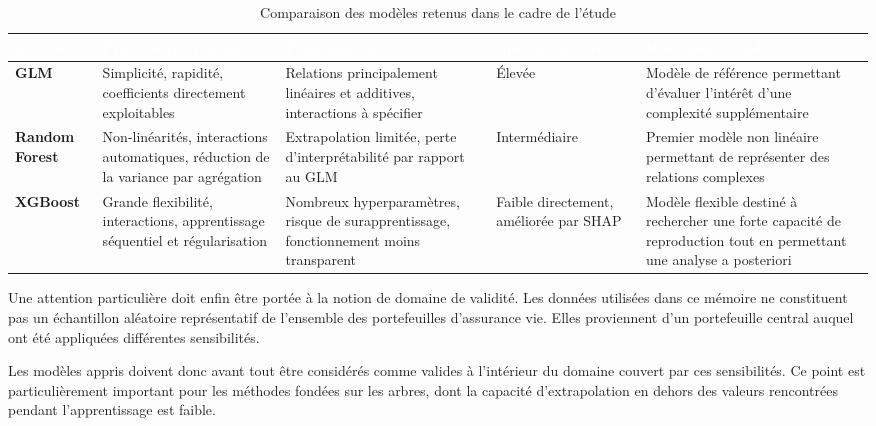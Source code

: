\begin{table}[H]
  \centering
  \caption{Comparaison des modèles retenus dans le cadre de l'étude}
  \label{tab:comparaison-modeles}
  \footnotesize
  \renewcommand{\arraystretch}{1.35}
  \setlength{\tabcolsep}{6pt}
  \begin{tabularx}{\textwidth}{@{}>{\bfseries}p{1.7cm} L{0.98} L{0.92} C{1.9cm} L{1.10}@{}}
    \toprule
    \textcolor{white}{Modèle} &
    \textcolor{white}{\textbf{Principaux avantages}} &
    \textcolor{white}{\textbf{Principales limites}} &
    \textcolor{white}{\textbf{Interprétabilité}} &
    \textcolor{white}{\textbf{Rôle dans l'étude}} \\
    \midrule

    GLM &
    Simplicité, rapidité, coefficients directement exploitables &
    Relations principalement linéaires et additives, interactions à spécifier &
    Élevée &
    Modèle de référence permettant d'évaluer l'intérêt d'une complexité supplémentaire \\

    Random Forest &
    Non-linéarités, interactions automatiques, réduction de la variance par agrégation &
    Extrapolation limitée, perte d'interprétabilité par rapport au GLM &
    Intermédiaire &
    Premier modèle non linéaire permettant de représenter des relations complexes \\

    XGBoost &
    Grande flexibilité, interactions, apprentissage séquentiel et régularisation &
    Nombreux hyper\-paramètres, risque de surapprentissage, fonctionnement moins transparent &
    Faible directement, améliorée par SHAP &
    Modèle flexible destiné à rechercher une forte capacité de reproduction tout en permettant une analyse a posteriori \\

    \bottomrule
  \end{tabularx}
\end{table}

Une attention particulière doit enfin être portée à la notion de domaine de validité. Les données utilisées dans ce mémoire ne constituent pas un échantillon aléatoire représentatif de l'ensemble des portefeuilles d'assurance vie. Elles proviennent d'un portefeuille central auquel ont été appliquées différentes sensibilités.

Les modèles appris doivent donc avant tout être considérés comme valides à l'intérieur du domaine couvert par ces sensibilités. Ce point est particulièrement important pour les méthodes fondées sur les arbres, dont la capacité d'extrapolation en dehors des valeurs rencontrées pendant l'apprentissage est faible.


